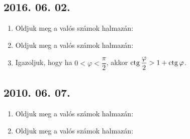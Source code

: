 \subsection*{2016. 06. 02.}
\begin{enumerate}

\item Oldjuk meg a valós számok halmazán: 

\item Oldjuk meg a valós számok halmazán:

\item Igazoljuk, hogy ha $0 < \varphi < \dfrac{\pi}{2}$, akkor $\mathop{\mathrm{ctg}}\nolimits{\dfrac{\varphi}{2}} > 1+\mathop{\mathrm{ctg}}\nolimits{\varphi}$.

\end{enumerate}
\subsection*{2010. 06. 07.}
\begin{enumerate}

\item Oldjuk meg a valós számok halmazán:

\item Oldjuk meg a valós számok halmazán:

\end{enumerate}

